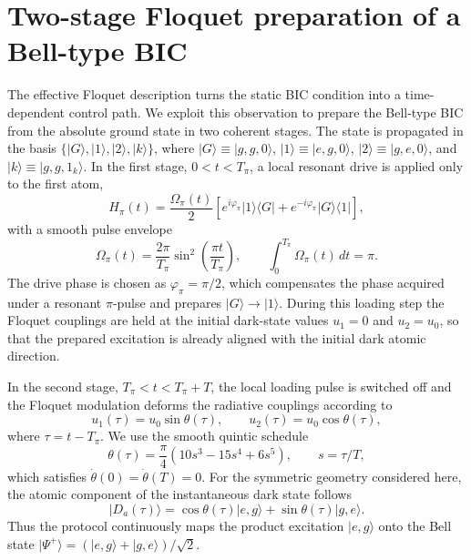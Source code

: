 \section{Two-stage Floquet preparation of a Bell-type BIC}
\label{sec:two_stage_protocol}

The effective Floquet description turns the static BIC condition into a
time-dependent control path. We exploit this observation to prepare the
Bell-type BIC from the absolute ground state in two coherent stages. The
state is propagated in the basis
\(\{|G\rangle,|1\rangle,|2\rangle,|k\rangle\}\), where
\(|G\rangle\equiv |g,g,0\rangle\),
\(|1\rangle\equiv |e,g,0\rangle\),
\(|2\rangle\equiv |g,e,0\rangle\), and
\(|k\rangle\equiv |g,g,1_k\rangle\). In the first stage, \(0<t<T_\pi\), a
local resonant drive is applied only to the first atom,
\begin{equation}
H_{\pi}(t)=\frac{\Omega_{\pi}(t)}{2}
\left[
e^{i\varphi_\pi}|1\rangle\langle G|
+ e^{-i\varphi_\pi}|G\rangle\langle 1|
\right],
\label{eq:local_pi_pulse}
\end{equation}
with a smooth pulse envelope
\begin{equation}
\Omega_{\pi}(t)=\frac{2\pi}{T_\pi}\sin^2\!\left(\frac{\pi t}{T_\pi}\right),
\qquad
\int_0^{T_\pi}\Omega_\pi(t)\,dt=\pi .
\label{eq:pi_pulse_envelope}
\end{equation}
The drive phase is chosen as \(\varphi_\pi=\pi/2\), which compensates the
phase acquired under a resonant \(\pi\)-pulse and prepares
\(|G\rangle\rightarrow |1\rangle\). During this loading step the Floquet
couplings are held at the initial dark-state values \(u_1=0\) and
\(u_2=u_0\), so that the prepared excitation is already aligned with the
initial dark atomic direction.

In the second stage, \(T_\pi<t<T_\pi+T\), the local loading pulse is switched
off and the Floquet modulation deforms the radiative couplings according to
\begin{equation}
u_1(\tau)=u_0\sin\theta(\tau),\qquad
u_2(\tau)=u_0\cos\theta(\tau),
\label{eq:floquet_coupling_path}
\end{equation}
where \(\tau=t-T_\pi\). We use the smooth quintic schedule
\begin{equation}
\theta(\tau)=\frac{\pi}{4}\left(10s^3-15s^4+6s^5\right),
\qquad s=\tau/T ,
\label{eq:quintic_schedule}
\end{equation}
which satisfies \(\dot{\theta}(0)=\dot{\theta}(T)=0\). For the symmetric
geometry considered here, the atomic component of the instantaneous dark
state follows
\begin{equation}
|D_a(\tau)\rangle =
\cos\theta(\tau)|e,g\rangle+\sin\theta(\tau)|g,e\rangle .
\label{eq:target_dark_atomic_path}
\end{equation}
Thus the protocol continuously maps the product excitation \(|e,g\rangle\)
onto the Bell state
\(|\Psi^+\rangle=(|e,g\rangle+|g,e\rangle)/\sqrt{2}\).

